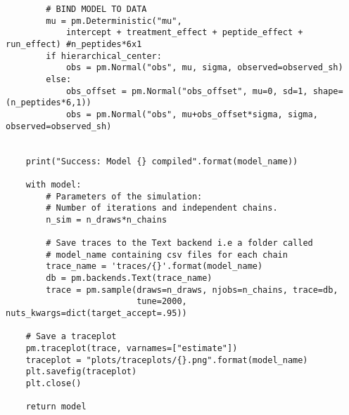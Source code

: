 \documentclass[a4paper]{article}
\begin{document}
\begin{verbatim}
        # BIND MODEL TO DATA
        mu = pm.Deterministic("mu", 
            intercept + treatment_effect + peptide_effect + run_effect) #n_peptides*6x1
        if hierarchical_center:
            obs = pm.Normal("obs", mu, sigma, observed=observed_sh)
        else:
            obs_offset = pm.Normal("obs_offset", mu=0, sd=1, shape=(n_peptides*6,1))
            obs = pm.Normal("obs", mu+obs_offset*sigma, sigma, observed=observed_sh)


    print("Success: Model {} compiled".format(model_name))

    with model:
        # Parameters of the simulation:
        # Number of iterations and independent chains.
        n_sim = n_draws*n_chains

        # Save traces to the Text backend i.e a folder called
        # model_name containing csv files for each chain
        trace_name = 'traces/{}'.format(model_name)
        db = pm.backends.Text(trace_name)
        trace = pm.sample(draws=n_draws, njobs=n_chains, trace=db,
                          tune=2000, nuts_kwargs=dict(target_accept=.95))
    
    # Save a traceplot 
    pm.traceplot(trace, varnames=["estimate"])
    traceplot = "plots/traceplots/{}.png".format(model_name)
    plt.savefig(traceplot)
    plt.close()
       
    return model
    
\end{verbatim}
\end{document}
